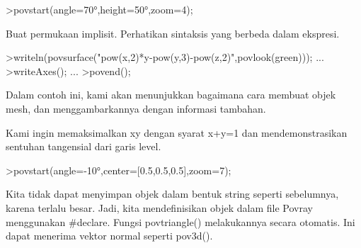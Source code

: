 \documentclass{article}
\begin{document}
\begin{eulernotebook}
\begin{eulercomment}
\begin{eulercomment}
\begin{eulercomment}
\begin{eulercomment}
\begin{eulerprompt}
>povstart(angle=70°,height=50°,zoom=4);
\end{eulerprompt}
\begin{eulercomment}
Buat permukaan implisit. Perhatikan sintaksis yang berbeda dalam
ekspresi.
\end{eulercomment}
\begin{eulerprompt}
>writeln(povsurface("pow(x,2)*y-pow(y,3)-pow(z,2)",povlook(green))); ...
>writeAxes(); ...
>povend();
\end{eulerprompt}
\begin{eulercomment}
Dalam contoh ini, kami akan menunjukkan bagaimana cara membuat objek
mesh, dan menggambarkannya dengan informasi tambahan.

Kami ingin memaksimalkan xy dengan syarat x+y=1 dan mendemonstrasikan
sentuhan tangensial dari garis level.
\end{eulercomment}
\begin{eulerprompt}
>povstart(angle=-10°,center=[0.5,0.5,0.5],zoom=7);
\end{eulerprompt}
\begin{eulercomment}
Kita tidak dapat menyimpan objek dalam bentuk string seperti
sebelumnya, karena terlalu besar. Jadi, kita mendefinisikan objek
dalam file Povray menggunakan #declare. Fungsi povtriangle()
melakukannya secara otomatis. Ini dapat menerima vektor normal seperti
pov3d(). 


\end{eulercomment}
\end{eulercomment}
\end{eulercomment}
\end{eulercomment}
\end{eulercomment}
\end{eulernotebook}
\end{document}
